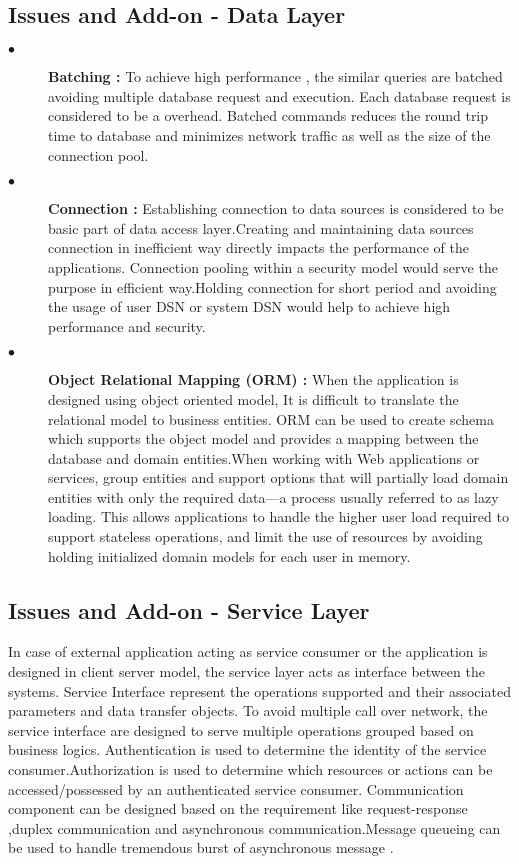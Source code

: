 \subsection{Issues and Add-on - Data Layer}	

\begin{description}
  \item[$\bullet$]{\bfseries Batching :}  To achieve high performance , the similar queries are batched avoiding multiple database request and execution. Each database request is considered to be a overhead. Batched commands reduces the round trip time to database and minimizes network traffic as well as the size of the connection pool.
 \item[$\bullet$]{\bfseries Connection :} Establishing connection to data sources is considered to be basic part of data access layer.Creating and maintaining data sources connection  in inefficient way directly impacts the performance of the applications. Connection pooling within a security model would serve the purpose in efficient way.Holding connection for short period and avoiding the usage of user DSN or system DSN would help to achieve high performance and security. 
 \item[$\bullet$]{\bfseries Object Relational Mapping (ORM) :} When the application is designed using object oriented model, It is difficult to translate the relational model to business entities. ORM can be used to create schema which supports the object model and provides a mapping between the database and domain entities.When working with Web applications or services, group entities and support options that will partially load domain entities with only the required data—a process usually referred to as lazy loading. This allows applications to handle the higher user load required to support stateless operations, and limit the use of resources by avoiding holding initialized domain models for each user in memory.
\end{description}  

\subsection{Issues and Add-on - Service Layer}	
                        In case of external application acting as service consumer or the application is designed in client server model, the service layer acts as interface between the systems. Service Interface represent the operations supported and their associated parameters and data transfer objects. To avoid multiple call over network, the service interface are designed to serve multiple operations grouped based on business logics. Authentication is used to determine the identity of the service consumer.Authorization is used to determine which resources or actions can be accessed/possessed by an authenticated service consumer. Communication component can be designed based on the requirement like request-response ,duplex communication and asynchronous communication.Message queueing can be used to handle tremendous burst of asynchronous message .
 